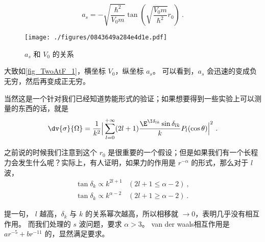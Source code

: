 \begin{equation}
a_s = - \sqrt{\frac{\hbar^2}{V_0 m}}\tan\left(\sqrt{\frac{V_0 m}{\hbar^2}}r_0\right)~.
\end{equation}

\begin{figure}[ht]
\centering
\texttt{[image: ./figures/0843649a284e4d1e.pdf]}
\caption{$a_s$ 和 $V_0$ 的关系} \label{fig_TwoAtF_1}
\end{figure}

大致如\autoref{fig_TwoAtF_1}，横坐标 $V_0$，纵坐标 $a_s$。 可以看到，$a_s$ 会迅速的变成负无穷，然后再变成正无穷。

当然这是一个针对我们已经知道势能形式的验证；如果想要得到一些实验上可以测量的东西的话，就是
\begin{equation}
\dv{\sigma}{\Omega} = \frac{1}{k^2}\Big|\sum_{l=0}^{+\infty}  (2l+1) \frac{\E^{\I\delta_{lk}}\sin\delta_{lk}}{k} P_l(\cos\theta) \Big|^2~.
\end{equation}

之前说的时候我们注意到这个 $r_0$ 是很重要的一个假设；但是如果我们有一个长程力会发生什么呢？实际上，有人证明，如果力的作用是 $r^{-\alpha}$ 的形式，那么对于 $l$ 波，
\begin{equation}
\begin{split}
\tan\delta_k \propto k^{2l+1} &(2l+1\le\alpha-2)~,\\
\tan\delta_k \propto k^{\alpha - 2} &(2l+1\ge\alpha-2)~.
\end{split}
\end{equation}

提一句， $l$ 越高，$\delta_k$ 与 $k$ 的关系幂次越高，所以相移就 $\to 0$，表明几乎没有相互作用。
而我们处理的 $s$ 波问题，要求 $\alpha>3$。 van der waals相互作用是 $ar^{-5}+br^{-11}$ 的，显然满足要求。


